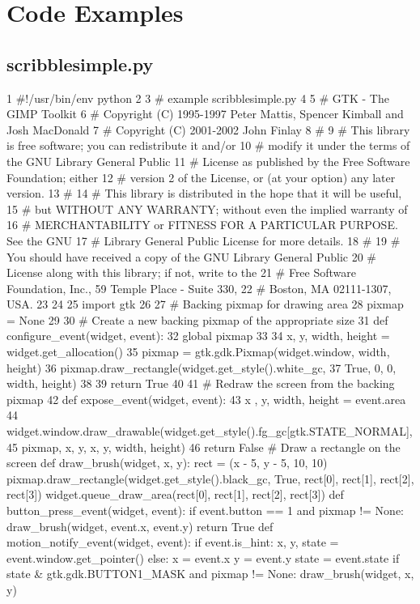 \chapter{Code Examples}
\section{scribblesimple.py}
1 #!/usr/bin/env python
2
3 # example scribblesimple.py
4
5 # GTK - The GIMP Toolkit
6 # Copyright (C) 1995-1997 Peter Mattis, Spencer Kimball and Josh MacDonald
7 # Copyright (C) 2001-2002 John Finlay
8 #
9 # This library is free software; you can redistribute it and/or
10 # modify it under the terms of the GNU Library General Public
11 # License as published by the Free Software Foundation; either
12 # version 2 of the License, or (at your option) any later version.
13 #
14 # This library is distributed in the hope that it will be useful,
15 # but WITHOUT ANY WARRANTY; without even the implied warranty of
16 # MERCHANTABILITY or FITNESS FOR A PARTICULAR PURPOSE. See the GNU
17 # Library General Public License for more details.
18 #
19 # You should have received a copy of the GNU Library General Public
20 # License along with this library; if not, write to the
21 # Free Software Foundation, Inc., 59 Temple Place - Suite 330,
22 # Boston, MA 02111-1307, USA.
23
24
25 import gtk
26
27 # Backing pixmap for drawing area
28 pixmap = None
29
30 # Create a new backing pixmap of the appropriate size
31 def configure_event(widget, event):
32
global pixmap
33
34
x, y, width, height = widget.get_allocation()
35
pixmap = gtk.gdk.Pixmap(widget.window, width, height)
36
pixmap.draw_rectangle(widget.get_style().white_gc,
37
True, 0, 0, width, height)
38
39
return True
40
41 # Redraw the screen from the backing pixmap
42 def expose_event(widget, event):
43
x , y, width, height = event.area
44
widget.window.draw_drawable(widget.get_style().fg_gc[gtk.STATE_NORMAL],
45
pixmap, x, y, x, y, width, height)
46
return False
# Draw a rectangle on the screen
def draw_brush(widget, x, y):
rect = (x - 5, y - 5, 10, 10)
pixmap.draw_rectangle(widget.get_style().black_gc, True,
rect[0], rect[1], rect[2], rect[3])
widget.queue_draw_area(rect[0], rect[1], rect[2], rect[3])
def button_press_event(widget, event):
if event.button == 1 and pixmap != None:
draw_brush(widget, event.x, event.y)
return True
def motion_notify_event(widget, event):
if event.is_hint:
x, y, state = event.window.get_pointer()
else:
x = event.x
y = event.y
state = event.state
if state & gtk.gdk.BUTTON1_MASK and pixmap != None:
draw_brush(widget, x, y)
